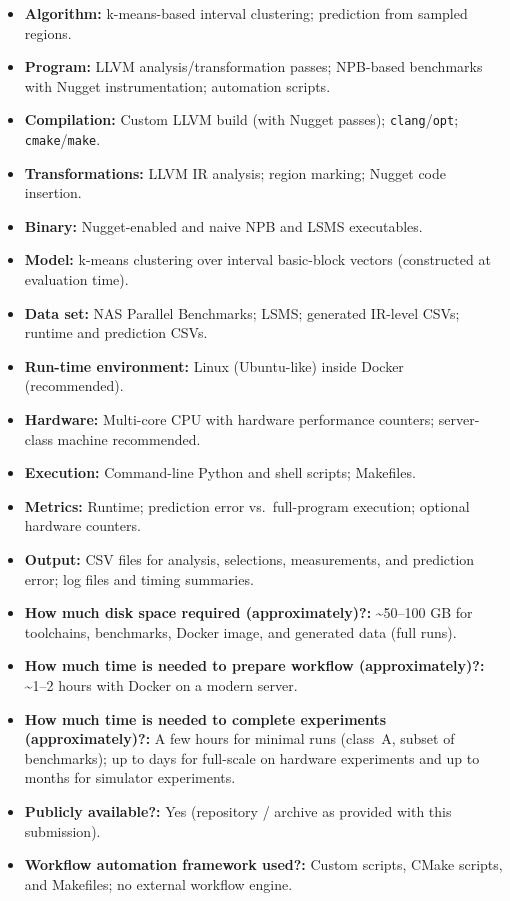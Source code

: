 {\small
\begin{itemize}
  \item {\bf Algorithm: } k-means-based interval clustering; prediction from sampled regions.
  \item {\bf Program: } LLVM analysis/transformation passes; NPB-based benchmarks with Nugget instrumentation; automation scripts.
  \item {\bf Compilation: } Custom LLVM build (with Nugget passes); \texttt{clang}/\texttt{opt}; \texttt{cmake}/\texttt{make}.
  \item {\bf Transformations: } LLVM IR analysis; region marking; Nugget code insertion.
  \item {\bf Binary: } Nugget-enabled and naive NPB and LSMS executables.
  \item {\bf Model: } k-means clustering over interval basic-block vectors (constructed at evaluation time).
  \item {\bf Data set: } NAS Parallel Benchmarks; LSMS; generated IR-level CSVs; runtime and prediction CSVs.
  \item {\bf Run-time environment: } Linux (Ubuntu-like) inside Docker (recommended).
  \item {\bf Hardware: } Multi-core CPU with hardware performance counters; server-class machine recommended.
  \item {\bf Execution: } Command-line Python and shell scripts; Makefiles.
  \item {\bf Metrics: } Runtime; prediction error vs.\ full-program execution; optional hardware counters.
  \item {\bf Output: } CSV files for analysis, selections, measurements, and prediction error; log files and timing summaries.
  \item {\bf How much disk space required (approximately)?: } \textasciitilde{}50--100 GB for toolchains, benchmarks, Docker image, and generated data (full runs).
  \item {\bf How much time is needed to prepare workflow (approximately)?: } \textasciitilde{}1--2 hours with Docker on a modern server.
  \item {\bf How much time is needed to complete experiments (approximately)?: } A few hours for minimal runs (class~A, subset of benchmarks); up to days for full-scale on hardware experiments and up to months for simulator experiments.
  \item {\bf Publicly available?: } Yes (repository / archive as provided with this submission).
  \item {\bf Workflow automation framework used?: } Custom scripts, CMake scripts, and Makefiles; no external workflow engine.
\end{itemize}
}

